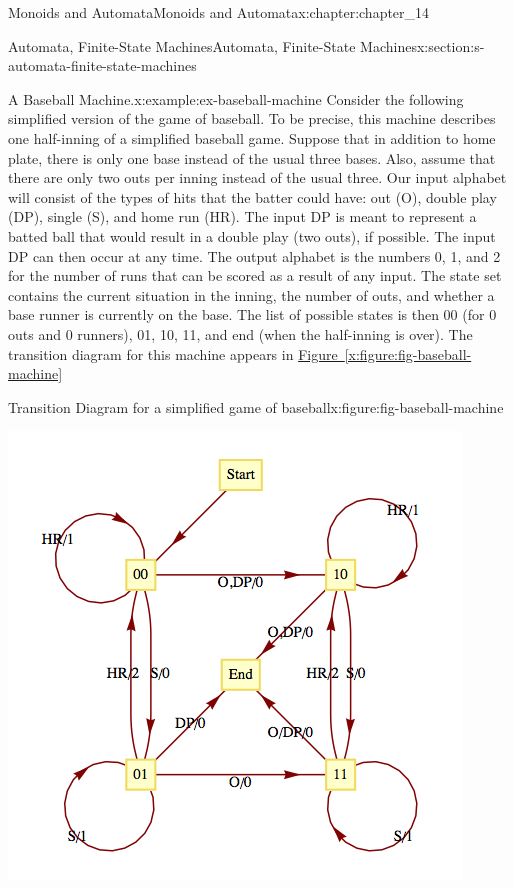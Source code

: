 \documentclass[oneside,10pt,]{book}
\newcommand{\xreffont}{\relax}
\numberwithin{equation}{section}
\begin{document}
\begin{chapterptx}{Monoids and Automata}{}{Monoids and Automata}{}{}{x:chapter:chapter_14}
\begin{sectionptx}{Automata, Finite-State Machines}{}{Automata, Finite-State Machines}{}{}{x:section:s-automata-finite-state-machines}
\begin{example}{A Baseball Machine.}{x:example:ex-baseball-machine}
Consider the following simplified version of the game of baseball. To be precise, this machine describes one half-inning of a simplified baseball game. Suppose that in addition to home plate, there is only one base instead of the usual three bases. Also, assume that there are only two outs per inning instead of the usual three. Our input alphabet will consist of the types of hits that the batter could have: out (O), double play (DP), single (S), and home run (HR). The input DP is meant to represent a batted ball that would result in a double play (two outs), if possible. The input DP can then occur at any time. The output alphabet is the numbers 0, 1, and 2 for the number of runs that can be scored as a result of any input. The state set contains the current situation in the inning, the number of outs, and whether a base runner is currently on the base. The list of possible states is then 00 (for 0 outs and 0 runners), 01, 10, 11, and end (when the half-inning is over). The transition diagram for this machine appears in \hyperref[x:figure:fig-baseball-machine]{Figure~{\xreffont\ref{x:figure:fig-baseball-machine}}}%
\begin{figureptx}{Transition Diagram for a simplified game of baseball}{x:figure:fig-baseball-machine}{}%
\begin{image}{0.15}{0.7}{0.15}%
\includegraphics[width=\linewidth]{images/fig-baseball-machine.png}

\end{image}
\end{figureptx}
\end{example}
\end{sectionptx}
\end{chapterptx}
\end{document}
